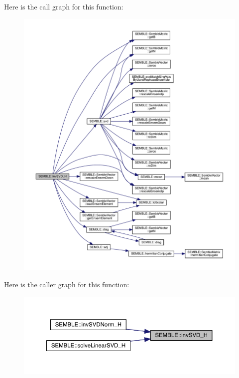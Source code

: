 Here is the call graph for this function\+:
\nopagebreak
\begin{figure}[H]
\begin{center}
\leavevmode
\includegraphics[width=350pt]{d7/dfd/namespaceSEMBLE_a752dade1ba0b0662d55c17cfdc66cddc_cgraph}
\end{center}
\end{figure}
Here is the caller graph for this function\+:
\nopagebreak
\begin{figure}[H]
\begin{center}
\leavevmode
\includegraphics[width=350pt]{d7/dfd/namespaceSEMBLE_a752dade1ba0b0662d55c17cfdc66cddc_icgraph}
\end{center}
\end{figure}
\mbox{\label{namespaceSEMBLE_a659cbbc5cfef77a1dcf4dbbeb8edab57}} 
